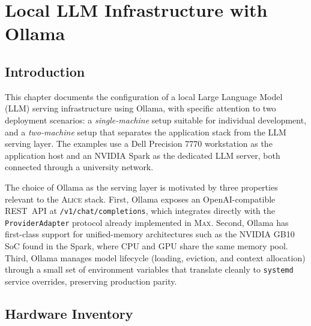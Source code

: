 %

\chapter{Local LLM Infrastructure with Ollama}
\label{ch:ollama-infrastructure}

\section{Introduction}

This chapter documents the configuration of a local Large Language Model
(LLM) serving infrastructure using Ollama, with specific attention to
two deployment scenarios: a \emph{single-machine} setup suitable for
individual development, and a \emph{two-machine} setup that separates
the application stack from the LLM serving layer. The examples use a
Dell Precision 7770 workstation as the application host and an NVIDIA
Spark as the dedicated LLM server, both connected through a university
network.

The choice of Ollama as the serving layer is motivated by three
properties relevant to the \textsc{Alice} stack. First, Ollama exposes
an OpenAI-compatible REST~API at \texttt{/v1/chat/completions}, which
integrates directly with the \texttt{ProviderAdapter} protocol already
implemented in \textsc{Max}. Second, Ollama has first-class support for
unified-memory architectures such as the NVIDIA GB10 SoC found in the
Spark, where CPU and GPU share the same memory pool. Third, Ollama
manages model lifecycle (loading, eviction, and context
allocation) through a small set of environment variables that translate
cleanly to \texttt{systemd} service overrides, preserving production
parity.

\section{Hardware Inventory}
\label{sec:hardware}

